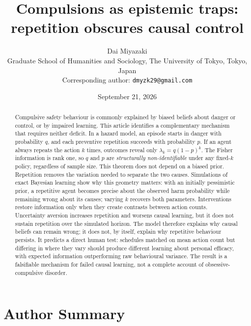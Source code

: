 \documentclass[11pt]{article}
\title{\textbf{Compulsions as epistemic traps:\\
repetition obscures causal control}}
\author{Dai Miyazaki\\
Graduate School of Humanities and Sociology, The University of Tokyo, Tokyo, Japan\\
Corresponding author: \texttt{dmyzk29@gmail.com}}
\date{September 21, 2026}
\newcommand{\lamk}{\lambda_k}
\begin{document}
\maketitle

\begin{abstract}
\noindent
Compulsive safety behaviour is commonly explained by biased beliefs about danger
or control, or by impaired learning. This article identifies a complementary
mechanism that requires neither deficit. In a hazard model, an episode starts in danger with
probability $q$, and each preventive repetition succeeds with probability $p$.
If an agent always repeats the action $k$ times, outcomes reveal only
$\lamk = q(1-p)^k$. The Fisher information is rank one, so $q$ and $p$ are
\emph{structurally non-identifiable} under any fixed-$k$ policy, regardless of
sample size. This theorem does not depend on a biased prior. Repetition removes
the variation needed to separate the two causes.
Simulations of exact Bayesian learning show why this geometry matters: with an
initially pessimistic prior, a repetitive agent becomes precise about the observed
harm probability while remaining wrong about its causes; varying $k$ recovers both
parameters. Interventions restore information only when they create contrasts
between action counts. Uncertainty aversion increases repetition and worsens
causal learning, but it does not sustain repetition over the simulated horizon.
The model therefore explains why causal beliefs can remain wrong; it does not, by
itself, explain why repetitive behaviour persists. It predicts a direct human
test: schedules matched on mean action count but differing in where they vary
should produce different learning about personal efficacy, with expected
information outperforming raw behavioural variance. The result is a falsifiable
mechanism for failed causal learning, not a complete account of
obsessive-compulsive disorder.
\end{abstract}

\section*{Author Summary}
\end{document}
